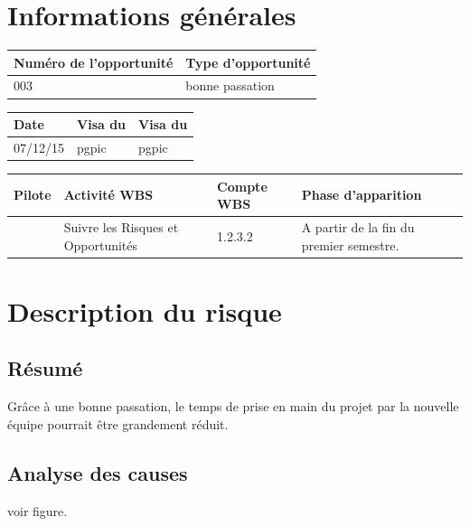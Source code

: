 \section*{Informations générales}
 
\begin{table}[H]
\centering
	\begin{tabularx}{16.8cm}{|X|X|}
	\hline
	\rowcolor{gray!40} Numéro de l'opportunité & Type d'opportunité \\
	\hline
	003 & bonne passation \\
	\hline
	\end{tabularx}
\end{table}

\begin{table}[H]
\centering
	\begin{tabularx}{16.8cm}{|X|X|X|}
	\hline
	\rowcolor{gray!40} Date & Visa du \RQ & Visa du \CP \\
	\hline
	 07/12/15 & pgpic & pgpic \\
	\hline
	\end{tabularx}
\end{table}

\begin{table}[H]
\centering
	\begin{tabularx}{16.8cm}{|X|X|X|X|}
	\hline
	\rowcolor{gray!40} Pilote & Activité WBS & Compte WBS & Phase d'apparition \\
	\hline
	 \Matthieu & Suivre les Risques et Opportunités & 1.2.3.2 & A partir de la fin du premier semestre.\\
	\hline
	\end{tabularx}
\end{table}

\section*{Description du risque}

\subsection*{Résumé}
	Grâce à une bonne passation, le temps de prise en main du projet par la nouvelle équipe pourrait être grandement réduit.
	
\subsection*{Analyse des causes}
	voir figure.

